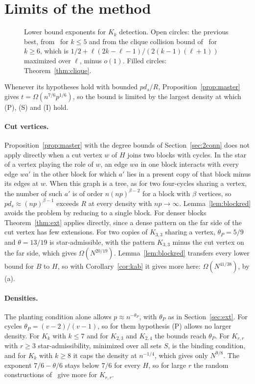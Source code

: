 \documentclass[11pt]{article}
\theoremstyle{remark}
\begin{document}
\section{Limits of the method}\label{sec:limits}

\begin{figure}[t]
\centering

\caption{Lower bound exponents for $K_k$ detection. Open circles: the previous best, from~\cite{CGZ26} for $k\le5$ and from the clique collision bound of~\cite[Corollary~4.6]{GZ26} for $k\ge6$, which is $1/2+\ell(2k-\ell-1)/(2(k-1)(\ell+1))$ maximized over $\ell$, minus $o(1)$. Filled circles: Theorem~\ref{thm:clique}.}
\label{fig:exponents}
\end{figure}

Whenever its hypotheses hold with bounded $pd_s/R$, Proposition~\ref{prop:master} gives $t=\Omega(n^{7/6}p^{1/6})$, so the bound is limited by the largest density at which (P), (S) and (I) hold.

\paragraph{Cut vertices.} Proposition~\ref{prop:master} with the degree bounds of Section~\ref{sec:2conn} does not apply directly when a cut vertex $w$ of $H$ joins two blocks with cycles. In the star of a vertex playing the role of $w$, an edge $wa$ in one block interacts with every edge $wa'$ in the other block for which $a'$ lies in a present copy of that block minus its edges at $w$. When this graph is a tree, as for two four-cycles sharing a vertex, the number of such $a'$ is of order $n(np)^{\beta-2}$ for a block with $\beta$ vertices, so $pd_s\approx(np)^{\beta-1}$ exceeds $R$ at every density with $np\to\infty$. Lemma~\ref{lem:blockred} avoids the problem by reducing to a single block. For denser blocks Theorem~\ref{thm:ext} applies directly, since a dense pattern on the far side of the cut vertex has few extensions. For two copies of $K_{3,3}$ sharing a vertex, $\theta_P=5/9$ and $\theta=13/19$ is star-admissible, with the pattern $K_{3,3}$ minus the cut vertex on the far side, which gives $\Omega(N^{20/19})$. Lemma~\ref{lem:blockred} transfers every lower bound for $B$ to $H$, so with Corollary~\ref{cor:kab} it gives more here: $\Omega(N^{41/38})$, by (a).

\paragraph{Densities.} The planting condition alone allows $p\approx n^{-\theta_P}$, with $\theta_P$ as in Section~\ref{sec:ext}. For cycles $\theta_P=(v-2)/(v-1)$, so for them hypothesis (P) allows no larger density. For $K_k$ with $k\le7$ and for $K_{2,3}$ and $K_{2,4}$ the bounds reach $\theta_P$. For $K_{r,r}$ with $r\ge3$ star-admissibility, minimized over all sets $S$, is the binding condition, and for $K_k$ with $k\ge8$ it caps the density at $n^{-1/4}$, which gives only $N^{9/8}$. The exponent $7/6-\theta/6$ stays below $7/6$ for every $H$, so for large $r$ the random constructions of~\cite{GZ26} give more for $K_{r,r}$.
\end{document}
